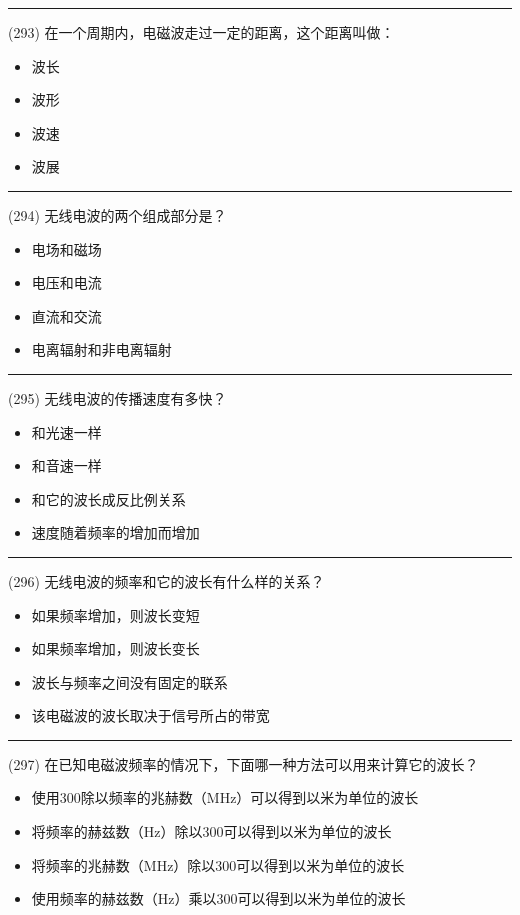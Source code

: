 \documentclass[twocolumn]{ctexart}  %
\begin{document}
\noindent\rule{0.5\textwidth}{1pt}
\heiti (293) 在一个周期内，电磁波走过一定的距离，这个距离叫做： \songti {\color{gray} [LK1106] }
\begin{itemize}
	\item  波长
	\item  波形
	\item  波速
	\item  波展
\end{itemize}


\noindent\rule{0.5\textwidth}{1pt}
\heiti (294) 无线电波的两个组成部分是？ \songti {\color{gray} [LK1108] }
\begin{itemize}
	\item  电场和磁场
	\item  电压和电流
	\item  直流和交流
	\item  电离辐射和非电离辐射
\end{itemize}


\noindent\rule{0.5\textwidth}{1pt}
\heiti (295) 无线电波的传播速度有多快？ \songti {\color{gray} [LK1109] }
\begin{itemize}
	\item  和光速一样
	\item  和音速一样
	\item  和它的波长成反比例关系
	\item  速度随着频率的增加而增加
\end{itemize}


\noindent\rule{0.5\textwidth}{1pt}
\heiti (296) 无线电波的频率和它的波长有什么样的关系？ \songti {\color{gray} [LK1110] }
\begin{itemize}
	\item  如果频率增加，则波长变短
	\item  如果频率增加，则波长变长
	\item  波长与频率之间没有固定的联系
	\item  该电磁波的波长取决于信号所占的带宽
\end{itemize}


\noindent\rule{0.5\textwidth}{1pt}
\heiti (297) 在已知电磁波频率的情况下，下面哪一种方法可以用来计算它的波长？ \songti {\color{gray} [LK1111] }
\begin{itemize}
	\item  使用300除以频率的兆赫数（MHz）可以得到以米为单位的波长
	\item  将频率的赫兹数（Hz）除以300可以得到以米为单位的波长
	\item  将频率的兆赫数（MHz）除以300可以得到以米为单位的波长
	\item  使用频率的赫兹数（Hz）乘以300可以得到以米为单位的波长
\end{itemize}
\end{document}
